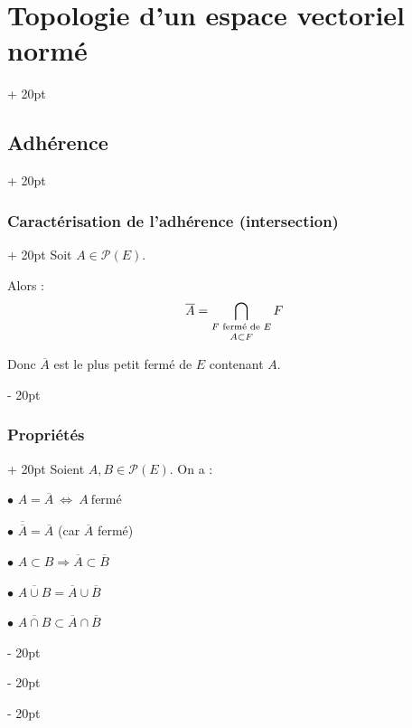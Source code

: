 \documentclass[a4paper, 12pt, twoside]{article}
\newcommand{\cj}[1]{\overline{#1}} %
\newcommand{\ssi}{\ \Leftrightarrow \ }
\newcommand{\ind}[1][20pt]{\advance\leftskip + #1}
\newcommand{\deind}[1][20pt]{\advance\leftskip - #1}
\newenvironment{indt}[2][20pt]{#2 \par \ind[#1]}{\par \deind} %
\begin{document}
\begin{indt}{\section{Topologie d'un espace vectoriel normé}}
\begin{indt}{\subsection{Adhérence}}
            \vspace{12pt}
            
            \begin{indt}{\subsubsection{Caractérisation de l'adhérence (intersection)}}
                Soit $A \in \mathcal P(E)$.

                Alors :
                \[
                    \cj A
                    =
                    \bigcap_{\substack{F \text{ fermé de } E \vspace{2pt} \\ A \subset F}} F
                \]

                Donc $\cj A$ est le plus petit fermé de $E$ contenant $A$.
            \end{indt}

            \vspace{12pt}
            
            \begin{indt}{\subsubsection{Propriétés}}
                Soient $A, B \in \mathcal P(E)$. On a :

                \vspace{6pt}
                
                $\bullet$ $A = \cj A \ssi A\ \text{fermé}$

                \vspace{3pt}

                $\bullet$ $\cj{\cj{A}} = \cj A$ (car $\cj A$ fermé)

                \vspace{3pt}

                $\bullet$ $A \subset B \Rightarrow \cj A \subset \cj B$

                \vspace{3pt}

                $\bullet$ $\cj{A \cup B} = \cj A \cup \cj B$

                \vspace{3pt}

                $\bullet$ $\cj{A \cap B} \subset \cj A \cap \cj B$
            \end{indt}


\end{indt}
\end{indt}
\end{document}
